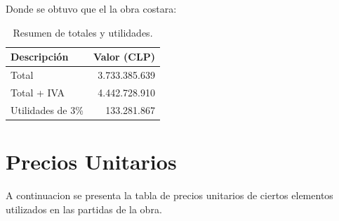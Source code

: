 \documentclass{article} %
\begin{document}
Donde se obtuvo que el la obra costara:

\begin{table}[H]
    \centering
    \begin{tabular}{|l|r|}
    \hline
    \textbf{Descripción}      & \textbf{Valor (CLP)} \\ \hline
    Total                     & 3.733.385.639       \\ \hline
    Total + IVA               & 4.442.728.910       \\ \hline
    Utilidades de 3\%         & 133.281.867         \\ \hline
    \end{tabular}
    \caption{Resumen de totales y utilidades.}
    \label{tabla-totales-utilidades}
\end{table}

\newpage
\section{Precios Unitarios}

A continuacion se presenta la tabla de precios unitarios de ciertos elementos utilizados en las partidas de la obra.
\end{document}
